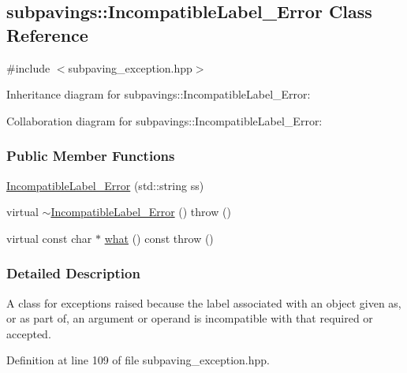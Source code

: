 \hypertarget{classsubpavings_1_1IncompatibleLabel__Error}{\subsection{subpavings\-:\-:\-Incompatible\-Label\-\_\-\-Error \-Class \-Reference}
\label{classsubpavings_1_1IncompatibleLabel__Error}
}


{\ttfamily \#include $<$subpaving\-\_\-exception.\-hpp$>$}



\-Inheritance diagram for subpavings\-:\-:\-Incompatible\-Label\-\_\-\-Error\-:


\-Collaboration diagram for subpavings\-:\-:\-Incompatible\-Label\-\_\-\-Error\-:
\subsubsection*{\-Public \-Member \-Functions}
\begin{DoxyCompactItemize}
\item 
\hyperlink{classsubpavings_1_1IncompatibleLabel__Error_adc9b30f1ad2daeb4bbceb18bf6a3ae28}{\-Incompatible\-Label\-\_\-\-Error} (std\-::string ss)
\item 
virtual \hyperlink{classsubpavings_1_1IncompatibleLabel__Error_a7ce84dc3e8429986e5b717ca824543bb}{$\sim$\-Incompatible\-Label\-\_\-\-Error} ()  throw ()
\item 
virtual const char $\ast$ \hyperlink{classsubpavings_1_1IncompatibleLabel__Error_a853912ee4bbff34e653343bf18c89679}{what} () const   throw ()
\end{DoxyCompactItemize}


\subsubsection{\-Detailed \-Description}
\-A class for exceptions raised because the label associated with an object given as, or as part of, an argument or operand is incompatible with that required or accepted. 

\-Definition at line 109 of file subpaving\-\_\-exception.\-hpp.




